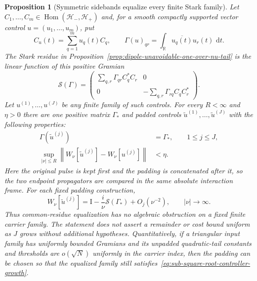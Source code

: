 \documentclass[11pt]{article}
\newtheorem{proposition}[theorem]{Proposition}
\theoremstyle{remark}
\newcommand{\Id}{\mathrm I}
\newcommand{\dd}{\,\mathrm d}
\begin{document}
\begin{proposition}[Symmetric sidebands equalize every finite Stark family]
\label{prop:finite-stark-gramian-equalization}
Let $C_1,\ldots,C_m\in
\operatorname{Hom}(\mathcal H_-,\mathcal H_+)$ and, for a smooth compactly
supported vector control $u=(u_1,\ldots,u_m)$, put
\[
 C_u(t)=\sum_{q=1}^m u_q(t)C_q,
 \qquad
 \Gamma(u)_{qr}=\int_{\mathbb R}\overline{u_q(t)}u_r(t)\,\dd t .
\]
The Stark residue in
Proposition~\ref{prop:dipole-unavoidable-one-over-nu-tail} is the linear
function of this positive Gramian
\begin{equation}
 \mathcal S(\Gamma)=
 \begin{pmatrix}
  \displaystyle\sum_{q,r}\Gamma_{qr}C_q^*C_r&0\\[2mm]
  0&\displaystyle-\sum_{q,r}\Gamma_{rq}C_qC_r^*
 \end{pmatrix}.
 \label{eq:stark-residue-gramian-map}
\end{equation}
Let $u^{(1)},\ldots,u^{(J)}$ be any finite family of such controls.  For every
$R<\infty$ and $\eta>0$ there are one positive matrix
$\Gamma_*$ and padded controls
$\widetilde u^{(1)},\ldots,\widetilde u^{(J)}$ with the following properties:
\begin{align}
 \Gamma(\widetilde u^{(j)})&=\Gamma_*,
 \qquad 1\leq j\leq J,
 \label{eq:exact-common-control-gramian}\\
 \sup_{|\nu|\leq R}
 \left\|W_\nu[\widetilde u^{(j)}]-W_\nu[u^{(j)}]\right\|
 &<\eta .
 \label{eq:sideband-padding-locally-invisible}
\end{align}
Here the original pulse is kept first and the padding is concatenated after
it, so the two endpoint propagators are compared in the same absolute
interaction frame.  For each fixed padding construction,
\begin{equation}
 W_\nu[\widetilde u^{(j)}]
 =
 \Id-\frac{i}{\nu}\mathcal S(\Gamma_*)+O_j(\nu^{-2}),
 \qquad |\nu|\longrightarrow\infty .
 \label{eq:equalized-common-stark-tail}
\end{equation}
Thus common-residue equalization has no algebraic obstruction on a fixed
finite carrier family.  The statement does not assert a remainder or cost
bound uniform as $J$ grows without additional hypotheses.  Quantitatively, if
a triangular input family has uniformly bounded Gramians and its unpadded
quadratic-tail constants and thresholds are $o(\sqrt N)$ uniformly in the
carrier index, then the padding can be chosen so that the equalized family
still satisfies~\eqref{eq:sub-square-root-controller-growth}.
\end{proposition}
\end{document}
